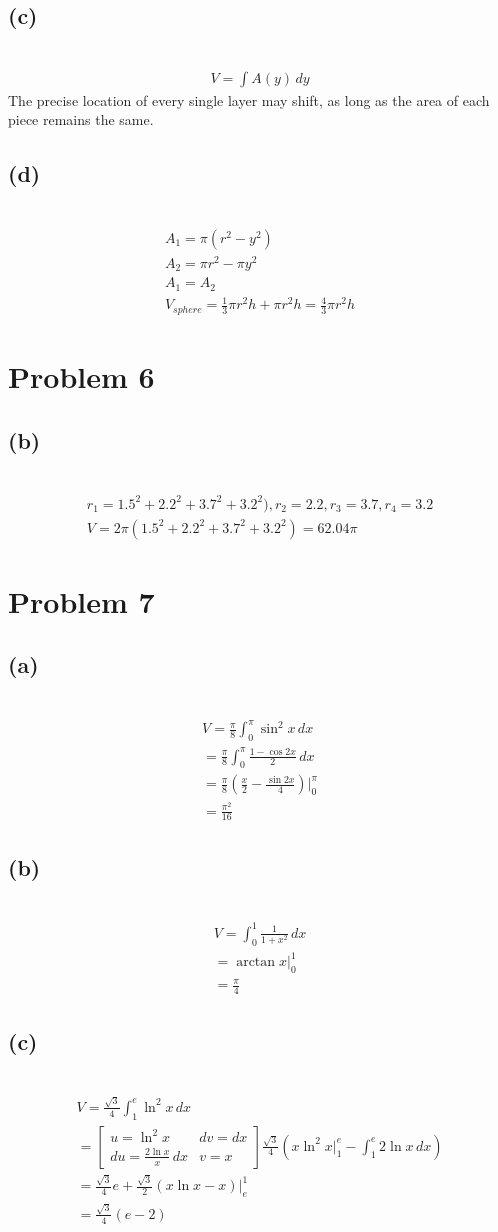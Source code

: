 \documentclass[12pt]{article}
\newcommand{\vem}{\vspace{0.5em}}
\newcommand{\problem}[1]{\section{Problem #1}}
\newcommand{\subproblem}[1]{\subsection{(#1)} \,}
\begin{document}
\subproblem{c}
\begin{gather*}
    V= \int A(y)\, dy
\end{gather*}
The precise location of every single layer may shift, as long as the area of each piece remains the same.\vem

\subproblem{d}
\begin{gather*}
    A_1=\pi (r^2-y^2)\\
    A_2= \pi r^2-\pi y^2\\
    A_1=A_2\\
    V_{sphere} = \frac{1}{3}\pi r^2h+\pi r^2h=\boxed{\frac{4}{3}\pi r^2h}
\end{gather*}

\problem{6}

\subproblem{b}
\begin{gather*}
    r_1=1.5^2+2.2^2+3.7^2+3.2^2), r_2=2.2,r_3=3.7, r_4=3.2\\
    V=2\pi (1.5^2+2.2^2+3.7^2+3.2^2) = \boxed{62.04\pi}
\end{gather*}

\problem{7}

\subproblem{a}
\begin{gather*}
    V= \frac{\pi}{8} \int_{0}^{\pi} \sin^2 x \, dx\\
    = \frac{\pi}{8} \int_0^\pi \frac{1-\cos 2x}{2}\, dx\\
    = \frac{\pi}{8}(\frac{x}{2}- \frac{\sin 2x}{4}) \Big|_0^\pi\\
    =  \boxed{\frac{\pi^2}{16}}
\end{gather*}

\subproblem{b}
\begin{gather*}
    V=\int_0^1 \frac{1}{1+x^2} \, dx\\
    = \arctan x \Big|^1_0\\
    = \boxed{\frac{\pi}{4}}
\end{gather*}

\subproblem{c}
\begin{gather*}
    V= \frac{\sqrt{3}}{4}\int_1^e \ln^2x\,d x\\
    = \begin{bmatrix}
        u=\ln^2x & dv=dx\\
        du = \frac{2\ln x}{x}\, dx & v=x
    \end{bmatrix}  \frac{\sqrt{3}}{4}(x\ln ^2 x \Big|^e_1 - \int_1^e 2\ln x\, dx)\\
    =\frac{\sqrt{3}}{4} e + \frac{\sqrt{3}}{2}(x\ln x-x)\Big|_e^1\\
    =\boxed{\frac{\sqrt{3}}{4}(e-2)}
\end{gather*}
\end{document}
